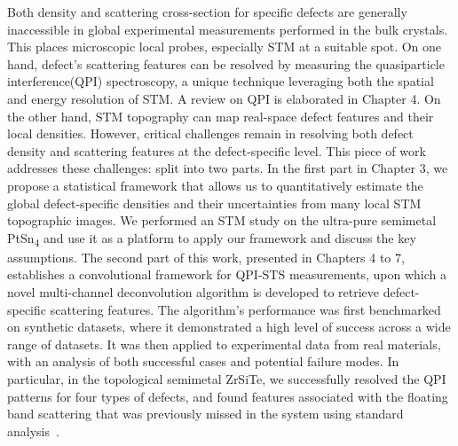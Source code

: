 Both density and scattering cross-section for specific defects are generally inaccessible in global experimental measurements performed in the bulk crystals. This places microscopic local probes, especially \ac{STM} at a suitable spot. On one hand, defect's scattering features can be resolved by measuring the quasiparticle interference(QPI) spectroscopy, a unique technique leveraging both the spatial and energy resolution of \ac{STM}. A review on \ac{QPI} is elaborated in Chapter 4. On the other hand, \ac{STM} topography can map real-space defect features and their local densities. However, critical challenges remain in resolving both defect density and scattering features at the defect-specific level. This piece of work addresses these challenges: split into two parts. In the first part in Chapter 3, we propose a statistical framework that allows us to quantitatively estimate the global defect-specific densities and their uncertainties from many local \ac{STM} topographic images. We performed an \ac{STM} study on the ultra-pure semimetal PtSn\textsubscript{4} and use it as a platform to apply our framework and discuss the key assumptions. The second part of this work, presented in Chapters 4 to 7, establishes a convolutional framework for QPI-STS measurements, upon which a novel multi-channel deconvolution algorithm is developed to retrieve defect-specific scattering features. The algorithm’s performance was first benchmarked on synthetic datasets, where it demonstrated a high level of success across a wide range of datasets. It was then applied to experimental data from real materials, with an analysis of both successful cases and potential failure modes. In particular, in the topological semimetal ZrSiTe, we successfully resolved the \ac{QPI} patterns for four types of defects, and found features associated with the floating band scattering that was previously missed in the system using standard analysis~\cite{stuartQuasiparticleInterferenceObservation2022}.  